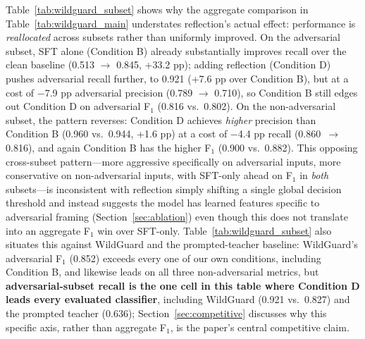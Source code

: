 \documentclass[superintelligence,article,accept,moreauthors]{Definitions/mdpi}
\begin{document}
Table~\ref{tab:wildguard_subset} shows why the aggregate comparison in Table~\ref{tab:wildguard_main} understates reflection's actual effect: performance is \emph{reallocated} across subsets rather than uniformly improved. On the adversarial subset, SFT alone (Condition B) already substantially improves recall over the clean baseline (0.513 $\to$ 0.845, +33.2 pp); adding reflection (Condition D) pushes adversarial recall further, to 0.921 (+7.6 pp over Condition B), but at a cost of $-$7.9 pp adversarial precision (0.789 $\to$ 0.710), so Condition B still edges out Condition D on adversarial F$_1$ (0.816 vs.\ 0.802). On the non-adversarial subset, the pattern reverses: Condition D achieves \emph{higher} precision than Condition B (0.960 vs.\ 0.944, +1.6 pp) at a cost of $-$4.4 pp recall (0.860~$\to$ 0.816), and again Condition B has the higher F$_1$ (0.900 vs.\ 0.882). This opposing cross-subset pattern---more aggressive specifically on adversarial inputs, more conservative on non-adversarial inputs, with SFT-only ahead on F$_1$ in \emph{both} subsets---is inconsistent with reflection simply shifting a single global decision threshold and instead suggests the model has learned features specific to adversarial framing (Section~\ref{sec:ablation}) even though this does not translate into an aggregate F$_1$ win over SFT-only. Table~\ref{tab:wildguard_subset} also situates this against WildGuard and the prompted-teacher baseline: WildGuard's adversarial F$_1$ (0.852) exceeds every one of our own conditions, including Condition B, and likewise leads on all three non-adversarial metrics, but \textbf{adversarial-subset recall is the one cell in this table where Condition D leads every evaluated classifier}, including WildGuard (0.921 vs.\ 0.827) and the prompted teacher (0.636); Section~\ref{sec:competitive} discusses why this specific axis, rather than aggregate F$_1$, is the paper's central competitive claim.
\end{document}
